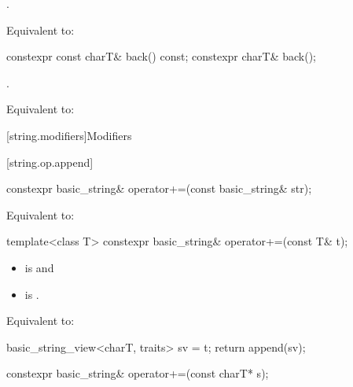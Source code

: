 \begin{itemdescr}
\pnum
\expects
{}.

\pnum
\effects
Equivalent to: 
\end{itemdescr}

%
\begin{itemdecl}
constexpr const charT& back() const;
constexpr charT& back();
\end{itemdecl}

\begin{itemdescr}
\pnum
\expects
{}.

\pnum
\effects
Equivalent to: 
\end{itemdescr}

[string.modifiers]{Modifiers}

[string.op.append]{}

%
\begin{itemdecl}
constexpr basic_string& operator+=(const basic_string& str);
\end{itemdecl}

\begin{itemdescr}
\pnum
\effects
Equivalent to: 


\end{itemdescr}

%
\begin{itemdecl}
template<class T>
  constexpr basic_string& operator+=(const T& t);
\end{itemdecl}

\begin{itemdescr}
\pnum
\constraints
\begin{itemize}
\item
{} is
 and
\item
{} is
.
\end{itemize}

\pnum
\effects
Equivalent to:
\begin{codeblock}
basic_string_view<charT, traits> sv = t;
return append(sv);
\end{codeblock}
\end{itemdescr}

%
\begin{itemdecl}
constexpr basic_string& operator+=(const charT* s);
\end{itemdecl}

